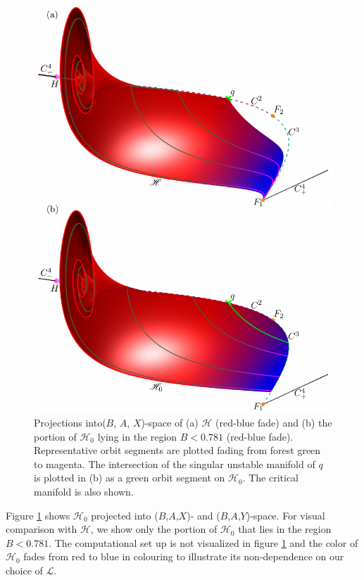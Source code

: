 \documentclass{ws-ijbc}
\begin{document}
\begin{figure}[H]
\centering
\includegraphics[]{./figures/MKMO_11.pdf}
\caption{Projections into($B$, $A$, $X$)-space of (a) $\mathscr{H}$ (red-blue fade) and (b) the portion of $\mathscr{H}_0$ lying in the region $B < 0.781$ (red-blue fade).  Representative orbit segments are plotted fading from forest green to magenta.  The intersection of the singular unstable manifold of $q$ is plotted in (b) as a green orbit segment on $\mathscr{H}_0$.  The critical manifold is also shown.}
\label{heteroclinic_singular}
\end{figure}

Figure \ref{heteroclinic_singular} shows $\mathscr{H}_0$ projected into ($B$,$A$,$X$)- and ($B$,$A$,$Y$)-space.  For visual comparison with $\mathscr{H}$, we show only the portion of $\mathscr{H}_0$ that lies in the region $B < 0.781$.  The computational set up is not visualized in figure \ref{heteroclinic_singular} and the color of $\mathscr{H}_0$ fades from red to blue in colouring to illustrate its non-dependence on our choice of $\mathscr{L}$.
\end{document}
